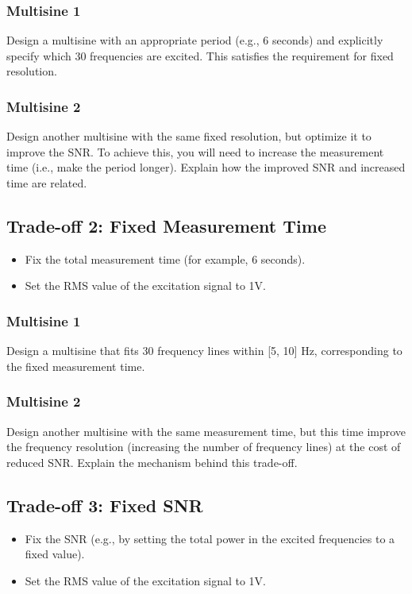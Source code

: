 \documentclass[a4paper,12pt]{article}
\begin{document}
\subsubsection*{Multisine 1}
Design a multisine with an appropriate period (e.g., 6 seconds) and explicitly specify which 30 frequencies are excited. This satisfies the requirement for fixed resolution.
\subsubsection*{Multisine 2}
Design another multisine with the same fixed resolution, but optimize it to improve the SNR. To achieve this, you will need to increase the measurement time (i.e., make the period longer). Explain how the improved SNR and increased time are related.

\subsection*{Trade-off 2: Fixed Measurement Time}
\begin{itemize}
    \item Fix the total measurement time (for example, 6 seconds).
    \item Set the RMS value of the excitation signal to 1V.
\end{itemize}
\subsubsection*{Multisine 1}
Design a multisine that fits 30 frequency lines within [5, 10] Hz, corresponding to the fixed measurement time.
\subsubsection*{Multisine 2}
Design another multisine with the same measurement time, but this time improve the frequency resolution (increasing the number of frequency lines) at the cost of reduced SNR. Explain the mechanism behind this trade-off.

\subsection*{Trade-off 3: Fixed SNR}
\begin{itemize}
    \item Fix the SNR (e.g., by setting the total power in the excited frequencies to a fixed value).
    \item Set the RMS value of the excitation signal to 1V.
\end{itemize}
\end{document}

